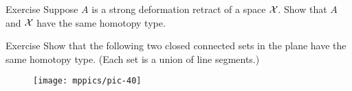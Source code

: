 \begin{thm}{Exercise}
Suppose $A$ is a strong deformation retract of a space $\mathcal{X}$.
Show that $A$ and $\mathcal{X}$ have the same homotopy type.
\end{thm}


\begin{thm}{Exercise}
Show that the following two closed connected sets in the plane have the same homotopy type.
(Each set is a union of line segments.)

\begin{figure}[!ht]
\centering
\texttt{[image: mppics/pic-40]}
\end{figure}
\end{thm}
